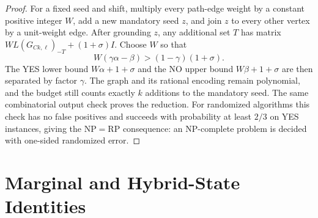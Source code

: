 \begin{proof}
For a fixed seed and shift, multiply every path-edge weight by
a constant positive integer $W$, add a new mandatory seed $z$,
and join $z$ to every other vertex by a unit-weight edge.
After grounding $z$, any additional set $T$ has matrix
$W L(G_{Ck,\ell})_{-T}+(1+\sigma)I$.
Choose $W$ so that
\[
 W(\gamma\alpha-\beta)>(1-\gamma)(1+\sigma).
\]
The YES lower bound $W\alpha+1+\sigma$ and the NO upper bound
$W\beta+1+\sigma$ are then separated by factor $\gamma$.
The graph and its rational encoding remain polynomial, and the
budget still counts exactly $k$ additions to the mandatory seed.
The same combinatorial output check proves the reduction.
For randomized algorithms this check has no false positives and
succeeds with probability at least $2/3$ on YES instances, giving the $\mathrm{NP}=\mathrm{RP}$ consequence: an NP-complete
problem is decided with one-sided randomized error.
\end{proof}



\section{Marginal and Hybrid-State Identities}\label{app:maintenance}

